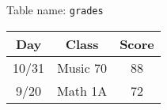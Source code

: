 Table name: \texttt{grades}
\begin{center}
\begin{tabular}{|c|c|c|}
 \hline
 \textbf{Day} & \textbf{Class} & \textbf{Score} \\
 \hline
 10/31 & Music 70 & 88 \\
 \hline
 9/20 & Math 1A & 72 \\
 \hline
\end{tabular}
\end{center}